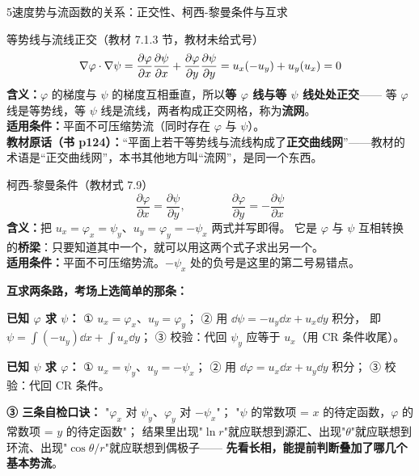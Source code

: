 \begin{kaodian}{5}{速度势与流函数的关系：正交性、柯西-黎曼条件与互求}
\begin{gongshi}{等势线与流线正交（教材 7.1.3 节，教材未给式号）}
\[ \nabla\varphi\cdot\nabla\psi
   =\frac{\partial\varphi}{\partial x}\frac{\partial\psi}{\partial x}
   +\frac{\partial\varphi}{\partial y}\frac{\partial\psi}{\partial y}
   =u_x(-u_y)+u_y(u_x)=0 \]
\textbf{含义：}$\varphi$ 的梯度与 $\psi$ 的梯度互相垂直，所以\textbf{等 $\varphi$ 线与等 $\psi$ 线处处正交}——
等 $\varphi$ 线是等势线，等 $\psi$ 线是流线，两者构成正交网格，称为\textbf{流网}。\\
\textbf{适用条件：}平面不可压缩势流（同时存在 $\varphi$ 与 $\psi$）。\\
\textbf{教材原话（书 p124）：}“平面上若干等势线与流线构成了\textbf{正交曲线网}”——教材的术语是“正交曲线网”，本书其他地方叫“流网”，是同一个东西。
\end{gongshi}

\begin{gongshi}{柯西-黎曼条件（教材式 7.9）}
\[ \frac{\partial\varphi}{\partial x}=\frac{\partial\psi}{\partial y},\qquad\qquad
   \frac{\partial\varphi}{\partial y}=-\frac{\partial\psi}{\partial x} \]
\textbf{含义：}把 $u_x=\varphi_x=\psi_y$、$u_y=\varphi_y=-\psi_x$ 两式并写即得。
它是 $\varphi$ 与 $\psi$ 互相转换的\textbf{桥梁}：只要知道其中一个，就可以用这两个式子求出另一个。\\
\textbf{适用条件：}平面不可压缩势流。$-\psi_x$ 处的负号是这里的第二号易错点。
\end{gongshi}

\begin{banfa}
\textbf{互求两条路，考场上选简单的那条：}

\textbf{已知 $\varphi$ 求 $\psi$：}
① $u_x=\varphi_x$、$u_y=\varphi_y$；
② 用 $\dd\psi=-u_y\dd x+u_x\dd y$ 积分，
即 $\psi=\int(-u_y)\dd x+\int u_x\dd y$；
③ 校验：代回 $\psi_y$ 应等于 $u_x$（用 CR 条件收尾）。

\textbf{已知 $\psi$ 求 $\varphi$：}
① $u_x=\psi_y$、$u_y=-\psi_x$；
② 用 $\dd\varphi=u_x\dd x+u_y\dd y$ 积分；
③ 校验：代回 CR 条件。

\textbf{③ 三条自检口诀：}
"$\varphi_x$ 对 $\psi_y$、$\varphi_y$ 对 $-\psi_x$"；
"$\psi$ 的常数项 = $x$ 的待定函数，$\varphi$ 的常数项 = $y$ 的待定函数"；
结果里出现"$\ln r$"就应联想到源汇、出现"$\theta$"就应联想到环流、出现"$\cos\theta/r$"就应联想到偶极子——
\textbf{先看长相，能提前判断叠加了哪几个基本势流}。
\end{banfa}


\end{kaodian}
